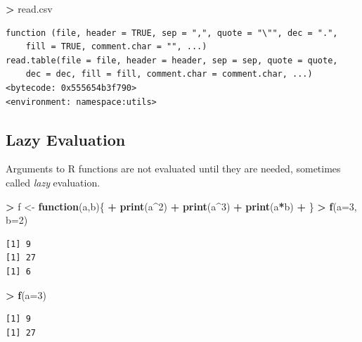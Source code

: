 \documentclass[]{krantz}
\makeatletter
\newenvironment{Shaded}{\begin{snugshade}}{\end{snugshade}}
\newcommand{\KeywordTok}[1]{\textcolor[rgb]{0.27,0.27,0.27}{\textbf{#1}}}
\newcommand{\DataTypeTok}[1]{\textcolor[rgb]{0.27,0.27,0.27}{#1}}
\newcommand{\DecValTok}[1]{\textcolor[rgb]{0.06,0.06,0.06}{#1}}
\newcommand{\StringTok}[1]{\textcolor[rgb]{0.5,0.5,0.5}{#1}}
\newcommand{\ControlFlowTok}[1]{\textcolor[rgb]{0.27,0.27,0.27}{\textbf{#1}}}
\newcommand{\OperatorTok}[1]{\textcolor[rgb]{0.43,0.43,0.43}{\textbf{#1}}}
\newcommand{\NormalTok}[1]{#1}
\newenvironment{kframe}{%
\medskip{}
\setlength{\fboxsep}{.8em}
 \def\at@end@of@kframe{}%
 \ifinner\ifhmode%
  \def\at@end@of@kframe{\end{minipage}}%
  \begin{minipage}{\columnwidth}%
 \fi\fi%
 \def\FrameCommand##1{\hskip\@totalleftmargin \hskip-\fboxsep
 \colorbox{shadecolor}{##1}\hskip-\fboxsep
     \hskip-\linewidth \hskip-\@totalleftmargin \hskip\columnwidth}%
 \MakeFramed {\advance\hsize-\width
   \@totalleftmargin\z@ \linewidth\hsize
   \@setminipage}}%
 {\par\unskip\endMakeFramed%
 \at@end@of@kframe}
\renewenvironment{Shaded}{\begin{kframe}}{\end{kframe}}
\makeatother
\begin{document}
\begin{Shaded}
\begin{Highlighting}[]
\OperatorTok{>}\StringTok{ }\NormalTok{read.csv}
\end{Highlighting}
\end{Shaded}

\begin{verbatim}
function (file, header = TRUE, sep = ",", quote = "\"", dec = ".", 
    fill = TRUE, comment.char = "", ...) 
read.table(file = file, header = header, sep = sep, quote = quote, 
    dec = dec, fill = fill, comment.char = comment.char, ...)
<bytecode: 0x555654b3f790>
<environment: namespace:utils>
\end{verbatim}

\subsection{Lazy Evaluation}\label{lazy-evaluation}

Arguments to R functions are not evaluated until they are needed,
sometimes called \emph{lazy} evaluation.

\begin{Shaded}
\begin{Highlighting}[]
\OperatorTok{>}\StringTok{ }\NormalTok{f <-}\StringTok{ }\ControlFlowTok{function}\NormalTok{(a,b)\{}
\OperatorTok{+}\StringTok{     }\KeywordTok{print}\NormalTok{(a}\OperatorTok{^}\DecValTok{2}\NormalTok{)}
\OperatorTok{+}\StringTok{     }\KeywordTok{print}\NormalTok{(a}\OperatorTok{^}\DecValTok{3}\NormalTok{)}
\OperatorTok{+}\StringTok{     }\KeywordTok{print}\NormalTok{(a}\OperatorTok{*}\NormalTok{b)}
\OperatorTok{+}\StringTok{ }\NormalTok{\}}
\OperatorTok{>}\StringTok{ }\KeywordTok{f}\NormalTok{(}\DataTypeTok{a=}\DecValTok{3}\NormalTok{, }\DataTypeTok{b=}\DecValTok{2}\NormalTok{)}
\end{Highlighting}
\end{Shaded}

\begin{verbatim}
[1] 9
[1] 27
[1] 6
\end{verbatim}

\begin{Shaded}
\begin{Highlighting}[]
\OperatorTok{>}\StringTok{ }\KeywordTok{f}\NormalTok{(}\DataTypeTok{a=}\DecValTok{3}\NormalTok{)}
\end{Highlighting}
\end{Shaded}

\begin{verbatim}
[1] 9
[1] 27
\end{verbatim}
\end{document}
